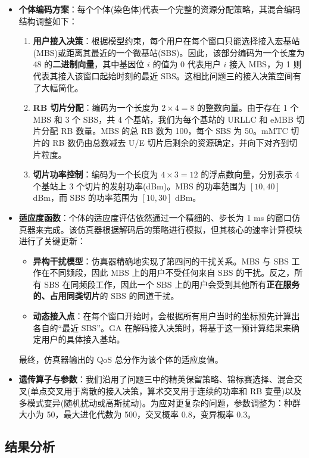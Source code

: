 \begin{itemize}
    \item \textbf{个体编码方案}：每个个体(染色体)代表一个完整的资源分配策略，其混合编码结构调整如下：
    \begin{enumerate}
        \item \textbf{用户接入决策}：根据模型约束，每个用户在每个窗口只能选择接入宏基站(MBS)或距离其最近的一个微基站(SBS)。因此，该部分编码为一个长度为 48 的\textbf{二进制向量}，其中基因位 $i$ 的值为 0 代表用户 $i$ 接入 MBS，为 1 则代表其接入该窗口起始时刻的最近 SBS。这相比问题三的接入决策空间有了大幅简化。
        \item \textbf{RB 切片分配}：编码为一个长度为 $2 \times 4 = 8$ 的整数向量。由于存在 1 个 MBS 和 3 个 SBS，共 4 个基站，我们为每个基站的 URLLC 和 eMBB 切片分配 RB 数量。MBS 的总 RB 数为 100，每个 SBS 为 50。mMTC 切片的 RB 数仍由总数减去 U/E 切片后剩余的资源确定，并向下对齐到切片粒度。
        \item \textbf{切片功率控制}：编码为一个长度为 $4 \times 3 = 12$ 的浮点数向量，分别表示 4 个基站上 3 个切片的发射功率(dBm)。MBS 的功率范围为 $[10, 40]$ dBm，而 SBS 的功率范围为 $[10, 30]$ dBm。
    \end{enumerate}

    \item \textbf{适应度函数}：个体的适应度评估依然通过一个精细的、步长为 1 ms 的窗口仿真器来完成。该仿真器根据解码后的策略进行模拟，但其核心的速率计算模块进行了关键更新：
    \begin{itemize}
        \item \textbf{异构干扰模型}：仿真器精确地实现了第四问的干扰关系。MBS 与 SBS 工作在不同频段，因此 MBS 上的用户不受任何来自 SBS 的干扰。反之，所有 SBS 在同频段工作，因此一个 SBS 上的用户会受到其他所有\textbf{正在服务的、占用同类切片}的 SBS 的同道干扰。
        \item \textbf{动态接入点}：在每个窗口开始时，会根据所有用户当时的坐标预先计算出各自的“最近 SBS”。GA 在解码接入决策时，将基于这一预计算结果来确定用户的具体接入基站。
    \end{itemize}
    最终，仿真器输出的 QoS 总分作为该个体的适应度值。

    \item \textbf{遗传算子与参数}：我们沿用了问题三中的精英保留策略、锦标赛选择、混合交叉(单点交叉用于离散的接入决策，算术交叉用于连续的功率和 RB 变量)以及多模式变异(随机扰动或高斯扰动)。为应对更复杂的问题，参数调整为：种群大小为 50，最大进化代数为 500，交叉概率 0.8，变异概率 0.3。
\end{itemize}

\subsection{结果分析}
